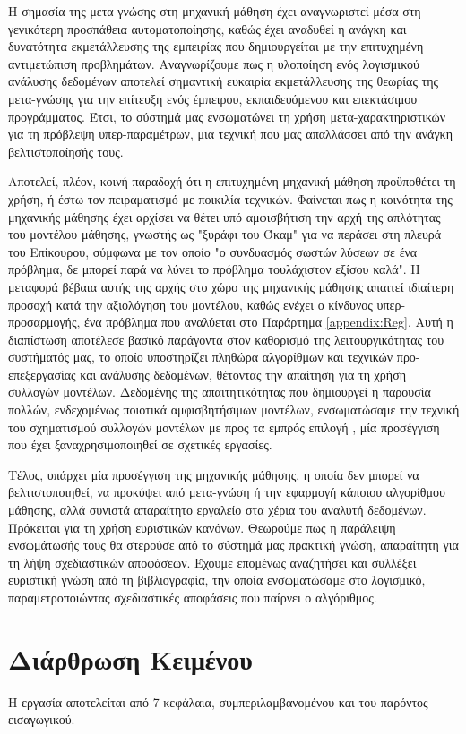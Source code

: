 Η σημασία της μετα-γνώσης στη μηχανική μάθηση έχει αναγνωριστεί μέσα στη  γενικότερη προσπάθεια αυτοματοποίησης, καθώς έχει αναδυθεί η ανάγκη και δυνατότητα εκμετάλλευσης της εμπειρίας που δημιουργείται με την επιτυχημένη αντιμετώπιση προβλημάτων. Αναγνωρίζουμε πως η υλοποίηση ενός λογισμικού ανάλυσης δεδομένων αποτελεί σημαντική ευκαιρία εκμετάλλευσης της θεωρίας της μετα-γνώσης για την επίτευξη ενός έμπειρου, εκπαιδευόμενου και επεκτάσιμου προγράμματος. Έτσι, το σύστημά μας ενσωματώνει τη χρήση μετα-χαρακτηριστικών για τη πρόβλεψη υπερ-παραμέτρων, μια τεχνική που μας απαλλάσσει από την ανάγκη βελτιστοποίησής τους. 

Αποτελεί, πλέον, κοινή παραδοχή ότι η επιτυχημένη μηχανική μάθηση προϋποθέτει τη χρήση, ή έστω τον πειραματισμό με ποικιλία τεχνικών. Φαίνεται πως η κοινότητα της μηχανικής μάθησης έχει αρχίσει να θέτει υπό αμφισβήτιση την αρχή της απλότητας του μοντέλου μάθησης, γνωστής ως "ξυράφι του Όκαμ" για να περάσει στη πλευρά του Επίκουρου, σύμφωνα με τον οποίο "ο συνδυασμός σωστών λύσεων σε ένα πρόβλημα, δε μπορεί παρά να λύνει το πρόβλημα τουλάχιστον εξίσου καλά". Η μεταφορά βέβαια αυτής της αρχής στο χώρο της μηχανικής μάθησης απαιτεί ιδιαίτερη προσοχή κατά την αξιολόγηση του μοντέλου, καθώς ενέχει ο κίνδυνος υπερ-προσαρμογής, ένα πρόβλημα που αναλύεται στο Παράρτημα \ref{appendix:Reg}. Αυτή η διαπίστωση αποτέλεσε βασικό παράγοντα στον καθορισμό της λειτουργικότητας του συστήματός μας, το οποίο υποστηρίζει πληθώρα αλγορίθμων και τεχνικών προ-επεξεργασίας και ανάλυσης δεδομένων, θέτοντας την απαίτηση για τη χρήση συλλογών μοντέλων. Δεδομένης της απαιτητικότητας που δημιουργεί η παρουσία πολλών, ενδεχομένως ποιοτικά αμφισβητήσιμων μοντέλων, ενσωματώσαμε την τεχνική του σχηματισμού συλλογών μοντέλων με προς τα εμπρός επιλογή \citep{Caruana:2004:ESL:1015330.1015432}, μία προσέγγιση που έχει ξαναχρησιμοποιηθεί σε σχετικές εργασίες.

Τέλος, υπάρχει μία προσέγγιση της μηχανικής μάθησης, η οποία δεν μπορεί να βελτιστοποιηθεί, να προκύψει από μετα-γνώση ή την εφαρμογή κάποιου αλγορίθμου μάθησης, αλλά συνιστά απαραίτητο εργαλείο στα χέρια του αναλυτή δεδομένων. Πρόκειται για τη χρήση ευριστικών κανόνων. Θεωρούμε πως η παράλειψη ενσωμάτωσής τους θα στερούσε από το σύστημά μας πρακτική γνώση, απαραίτητη για τη λήψη σχεδιαστικών αποφάσεων. Έχουμε επομένως αναζητήσει και συλλέξει ευριστική γνώση από τη βιβλιογραφία, την οποία ενσωματώσαμε στο λογισμικό, παραμετροποιώντας σχεδιαστικές αποφάσεις που παίρνει ο αλγόριθμος.

\section{Διάρθρωση Κειμένου} Η εργασία αποτελείται από 7 κεφάλαια, συμπεριλαμβανομένου και του παρόντος εισαγωγικού.

